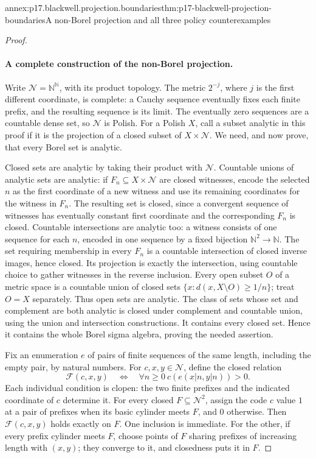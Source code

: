 \begin{annexitem}{annex:p17.blackwell.projection.boundaries}{thm:p17-blackwell-projection-boundaries}{A non-Borel projection and all three policy counterexamples}
\begin{proof}
\paragraph{A complete construction of the non-Borel projection.}
Write \(\mathcal N=\mathbb N^{\mathbb N}\), with its product
topology. The metric \(2^{-j}\), where \(j\) is the first
different coordinate, is complete: a Cauchy sequence eventually
fixes each finite prefix, and the resulting sequence is its
limit. The eventually zero sequences are a countable dense
set, so \(\mathcal N\) is Polish.
For a Polish \(X\), call a subset analytic in this proof
if it is the projection of a closed subset of \(X\times\mathcal N\).
We need, and now prove, that every Borel set is analytic.

Closed sets are analytic by taking their product with
\(\mathcal N\). Countable unions of analytic sets are analytic:
if \(F_n\subseteq X\times\mathcal N\) are closed witnesses,
encode the selected \(n\) as the first coordinate of a new
witness and use its remaining coordinates for the witness
in \(F_n\). The resulting set is closed, since a convergent
sequence of witnesses has eventually constant first coordinate
and the corresponding \(F_n\) is closed.
Countable intersections are analytic too: a witness consists
of one sequence for each \(n\), encoded in one sequence by
a fixed bijection \(\mathbb N^2\to\mathbb N\).
The set requiring membership in every \(F_n\) is a countable
intersection of closed inverse images, hence closed.
Its projection is exactly the intersection, using countable
choice to gather witnesses in the reverse inclusion.
Every open subset \(O\) of a metric space is a countable
union of closed sets
\(\{x:d(x,X\setminus O)\geq1/n\}\); treat \(O=X\)
separately. Thus open sets are analytic.
The class of sets whose set and complement are both analytic
is closed under complement and countable union, using the
union and intersection constructions. It contains every closed
set. Hence it contains the whole Borel sigma algebra, proving
the needed assertion.

Fix an enumeration \(e\) of pairs of finite sequences of
the same length, including the empty pair, by natural numbers.
For \(c,x,y\in\mathcal N\), define the closed relation
\[
 \mathcal F(c,x,y)\quad\Longleftrightarrow\quad
       \forall n\geq0\
       c(e(x|n,y|n))>0.
\]
Each individual condition is clopen: the two finite prefixes
and the indicated coordinate of \(c\) determine it.
For every closed \(F\subseteq\mathcal N^2\), assign the
code \(c\) value \(1\) at a pair of prefixes when its
basic cylinder meets \(F\), and \(0\) otherwise.
Then \(\mathcal F(c,x,y)\) holds exactly on \(F\).
One inclusion is immediate. For the other, if every prefix
cylinder meets \(F\), choose points of \(F\) sharing prefixes
of increasing length with \((x,y)\); they converge to it,
and closedness puts it in \(F\).


\end{proof}
\end{annexitem}
